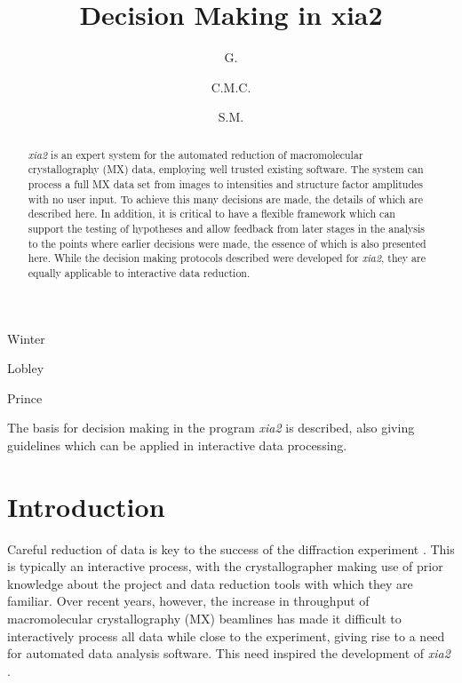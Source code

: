 \documentclass[preprint,pdf]{iucr}
\begin{document}
\title{Decision Making in xia2}

\author[a]{G.}{Winter}
\author[a]{C.M.C.}{Lobley}
\author[b]{S.M.}{Prince}


\maketitle
\clearpage

\begin{synopsis}
The basis for decision making in the program \emph{xia2} is described,
also giving guidelines which can be applied in interactive data processing.
\end{synopsis}

\begin{abstract}

\emph{xia2} is an expert system for the automated reduction of
macromolecular crystallography (MX) data, employing well trusted
existing software. The system can process a full MX data set from
images to intensities and structure factor amplitudes with no user
input. To achieve this many decisions are made, the details of which
are described here. In addition, it is critical to have a
flexible framework which can support the testing of hypotheses and
allow feedback from later stages in the analysis to the points where
earlier decisions were made, the essence of which is also
presented here. While the decision making protocols described were
developed for \emph{xia2}, they are equally applicable to interactive
data reduction.

\end{abstract}

\section{Introduction}

Careful reduction of data is key to the success of the diffraction
experiment \cite{Dauter:ba0020}. This is typically an interactive
process, with the crystallographer making use of prior knowledge about
the project and data reduction tools with which they are
familiar. Over recent years, however, the increase in throughput of
macromolecular crystallography (MX) beamlines has made it difficult to
interactively process all data while close to the experiment, giving
rise to a need for automated data analysis software. This need
inspired the development of \emph{xia2} \cite{Winter:ea5113}. 
\end{document}
